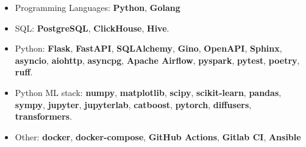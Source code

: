


\tagline{}

\begin{fullwidth}
\makecvheader
\end{fullwidth}




\divider


\divider


\divider

\begin{itemize}
	\item Programming Languages: \textbf{Python}, \textbf{Golang}
    \item SQL: \textbf{PostgreSQL}, \textbf{ClickHouse}, \textbf{Hive}.
    \item Python: \textbf{Flask}, \textbf{FastAPI}, \textbf{SQLAlchemy}, \textbf{Gino}, \textbf{OpenAPI}, \textbf{Sphinx}, \textbf{asyncio}, \textbf{aiohttp}, \textbf{asyncpg}, \textbf{Apache Airflow}, \textbf{pyspark}, \textbf{pytest}, \textbf{poetry}, \textbf{ruff}.
    \item Python ML stack: \textbf{numpy}, \textbf{matplotlib}, \textbf{scipy}, \textbf{scikit-learn}, \textbf{pandas}, \textbf{sympy}, \textbf{jupyter}, \textbf{jupyterlab}, \textbf{catboost}, \textbf{pytorch}, \textbf{diffusers}, \textbf{transformers}.
    \item Other: \textbf{docker}, \textbf{docker-compose}, \textbf{GitHub Actions}, \textbf{Gitlab CI}, \textbf{Ansible}
\end{itemize}

